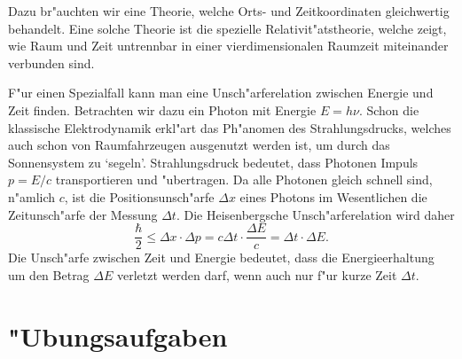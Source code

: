 Dazu br"auchten wir eine Theorie, welche Orts- und Zeitkoordinaten
gleichwertig behandelt.
Eine solche Theorie ist die spezielle Relativit"atstheorie, welche
zeigt, wie Raum und Zeit untrennbar in einer vierdimensionalen
Raumzeit miteinander verbunden sind.

F"ur einen Spezialfall kann man eine Unsch"arferelation zwischen
Energie und Zeit finden.
Betrachten wir dazu ein Photon mit Energie $E=h\nu$.
Schon die klassische Elektrodynamik erkl"art das Ph"anomen des
Strahlungsdrucks, welches auch schon von Raumfahrzeugen ausgenutzt
werden ist, um durch das Sonnensystem zu `segeln'.
Strahlungsdruck bedeutet, dass Photonen Impuls $p=E/c$ transportieren
und "ubertragen.
Da alle Photonen gleich schnell sind, n"amlich $c$, ist die
Positionsunsch"arfe $\Delta x$ eines Photons im Wesentlichen die
Zeitunsch"arfe der Messung $\Delta t$.
Die Heisenbergsche Unsch"arferelation wird daher
\[
\frac{\hbar}2\le \Delta x\cdot\Delta p=c\Delta t\cdot \frac{\Delta E}{c}=
\Delta t\cdot \Delta E.
\]
Die Unsch"arfe zwischen Zeit und Energie bedeutet, dass die
Energieerhaltung um den Betrag $\Delta E$ verletzt werden darf,
wenn auch nur f"ur kurze Zeit $\Delta t$.

\section*{"Ubungsaufgaben}
\begin{uebungsaufgaben}
\item

\item

\item

\end{uebungsaufgaben}
